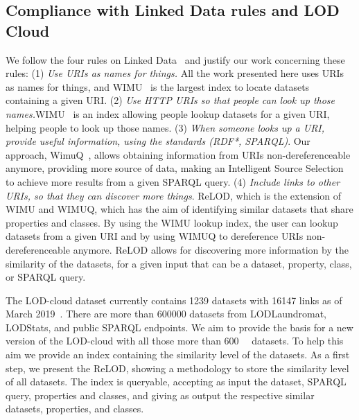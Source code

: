 \documentclass[sw]{iosart2x}
\begin{document}
\subsection{Compliance with Linked Data rules and LOD Cloud}
We follow the four rules on Linked Data~\cite{designissues-linkeddata} and justify our work concerning these rules:%
(1) \emph{Use URIs as names for things.} All the work presented here uses URIs as names for things, and WIMU~\cite{valdestilhas2018my} is the largest index to locate datasets containing a given URI.
(2) \emph{Use HTTP URIs so that people can look up those names.}WIMU~\cite{valdestilhas2018my} is an index allowing people lookup datasets for a given URI, helping people to look up those names.
(3) \emph{When someone looks up a URI, provide useful information, using the standards (RDF*, SPARQL)}.
Our approach, WimuQ~\cite{valdestilhas2019more}, allows obtaining information from URIs non-dereferenceable anymore, providing more source of data, making an Intelligent Source Selection to achieve more results from a given SPARQL query.
(4) \emph{Include links to other URIs, so that they can discover more things}.
ReLOD, which is the extension of WIMU and WIMUQ, which has the aim of identifying similar datasets that share properties and classes.
By using the WIMU lookup index, the user can lookup datasets from a given URI and by using WIMUQ to dereference URIs non-dereferenceable anymore.
ReLOD allows for discovering more information by the similarity of the datasets, for a given input that can be a dataset, property, class, or SPARQL query.

The LOD-cloud dataset currently contains \num{1239} datasets with \num{16147} links as of March 2019~\cite{lodcloud}.
There are more than \num{600000} datasets from LODLaundromat, LODStats, and public SPARQL endpoints.
We aim to provide the basis for a new version of the LOD-cloud with all those more than \SI{600}{\kilo\nothing} datasets.
To help this aim we provide an index containing the similarity level of the datasets.
As a first step, we present the ReLOD, showing a methodology to store the similarity level of all datasets.
The index is queryable, accepting as input the dataset, SPARQL query, properties and classes, and giving as output the respective similar datasets, properties, and classes.
\end{document}
